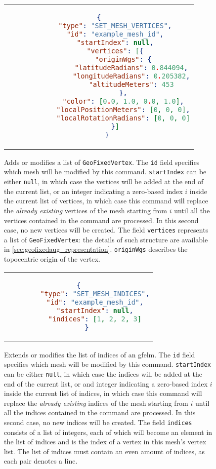 \begin{figure}
  \centering
  \begin{tabular}{c}
  \begin{lstlisting}[language=json]
    {
        "type": "SET_MESH_VERTICES",
        "id": "example_mesh_id",
        "startIndex": null,
        "vertices": [{
            "originWgs": {
                "latitudeRadians": 0.844094,
                "longitudeRadians": 0.205382,
                "altitudeMeters": 453
            },
            "color": [0.0, 1.0, 0.0, 1.0],
            "localPositionMeters": [0, 0, 0],
            "localRotationRadians": [0, 0, 0]
        }]
    }
  \end{lstlisting}
  \end{tabular}
  \caption{Adds or modifies a list of \texttt{GeoFixedVertex}. The \texttt{id} field specifies which mesh will be modified by this command. \texttt{startIndex} can be either \texttt{null}, in which case the vertices will be added at the end of the current list, or an integer indicating a zero-based index $i$ inside the current list of vertices, in which case this command will replace the \emph{already existing} vertices of the mesh starting from $i$ until all the vertices contained in the command are processed. In this second case, no new vertices will be created. The field \texttt{vertices} represents a list of \texttt{GeoFixedVertex}: the details of such structure are available in \autoref{sec:geofixedaug_representation}. \texttt{originWgs} describes the topocentric origin of the vertex.}\label{lst:gf_set_vertices}
\end{figure}

\begin{figure}
  \centering
  \begin{tabular}{c}
  \begin{lstlisting}[language=json]
    {
        "type": "SET_MESH_INDICES",
        "id": "example_mesh_id",
        "startIndex": null,
        "indices": [1, 2, 2, 3]
    }
  \end{lstlisting}
  \end{tabular}
  \caption{Extends or modifies the list of indices of an \gls{gfelm}. The \texttt{id} field specifies which mesh will be modified by this command. \texttt{startIndex} can be either \texttt{null}, in which case the indices will be added at the end of the current list, or and integer indicating a zero-based index $i$ inside the current list of indices, in which case this command will replace the \emph{already existing} indices of the mesh starting from $i$ until all the indices contained in the command are processed. In this second case, no new indices will be created. The field \texttt{indices} consists of a list of integers, each of which will become an element in the list of indices and is the index of a vertex in this mesh's vertex list. The list of indices must contain an even amount of indices, as each pair denotes a line.}\label{lst:gf_set_indices}
\end{figure}

